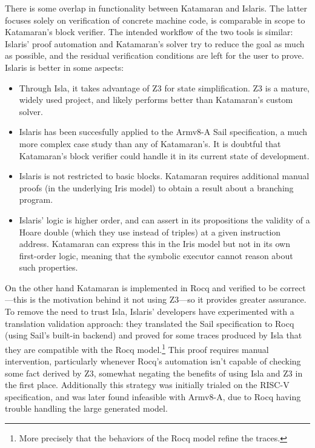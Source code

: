There is some overlap in functionality between Katamaran and Islaris. The latter focuses solely on verification of concrete machine code, \ie is comparable in scope to Katamaran's block verifier. The intended workflow of the two tools is similar: Islaris' proof automation and Katamaran's solver try to reduce the goal as much as possible, and the residual verification conditions are left for the user to prove. Islaris is better in some aspects:
\begin{itemize}
\item Through Isla, it takes advantage of Z3 for state simplification. Z3 is a mature, widely used project, and likely performs better than Katamaran's custom solver.
\item Islaris has been succesfully applied to the Armv8-A Sail specification, a much more complex case study than any of Katamaran's. It is doubtful that Katamaran's block verifier could handle it in its current state of development.
\item Islaris is not restricted to basic blocks. Katamaran requires additional manual proofs (in the underlying Iris model) to obtain a result about a branching program.
\item Islaris' logic is higher order, and can assert in its propositions the validity of a Hoare double (which they use instead of triples) at a given instruction address. Katamaran can express this in the Iris model but not in its own first-order logic, meaning that the symbolic executor cannot reason about such properties. %
\end{itemize}

On the other hand Katamaran is implemented in Rocq and verified to be correct---this is the motivation behind it not using Z3---so it provides greater assurance. To remove the need to trust Isla, Islaris' developers have experimented with a translation validation approach: they translated the Sail specification to Rocq (using Sail's built-in backend) and proved for some traces produced by Isla that they are compatible with the Rocq model.\footnote{More precisely that the behaviors of the Rocq model refine the traces.} This proof requires manual intervention, particularly whenever Rocq's automation isn't capable of checking some fact derived by Z3, somewhat negating the benefits of using Isla and Z3 in the first place. Additionally this strategy was initially trialed on the RISC-V specification, and was later found infeasible with Armv8-A, due to Rocq having trouble handling the large generated model.


